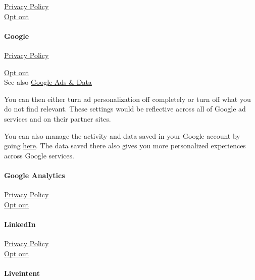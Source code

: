 \href{https://www.facebook.com/about/privacy/}{Privacy Policy}\\
\href{https://www.facebook.com/help/568137493302217}{Opt out}

\hypertarget{google}{%
\paragraph{Google}\label{google}}

\href{https://policies.google.com/privacy?hl=en}{Privacy Policy}

\href{https://adssettings.google.com/authenticated}{Opt out}\\
See also \href{https://safety.google/privacy/ads-and-data/}{Google Ads
\& Data}

You can then either turn ad personalization off completely or turn off
what you do not find relevant. These settings would be reflective across
all of Google ad services and on their partner sites.

You can also manage the activity and data saved in your Google account
by going
\href{https://myactivity.google.com/myactivity?authuser=0}{here}. The
data saved there also gives you more personalized experiences across
Google services.

\hypertarget{google-analytics}{%
\paragraph{Google Analytics}\label{google-analytics}}

\href{https://policies.google.com/privacy?hl=en-US}{Privacy Policy}\\
\href{https://tools.google.com/dlpage/gaoptout}{Opt out}

\hypertarget{linkedin}{%
\paragraph{LinkedIn}\label{linkedin}}

\href{https://www.linkedin.com/legal/privacy-policy}{Privacy Policy}\\
\href{https://www.linkedin.com/help/linkedin/answer/62931?trk=microsites-frontend_legal_privacy-policy\&lang=en}{Opt
out}

\hypertarget{liveintent}{%
\paragraph{Liveintent}\label{liveintent}}

